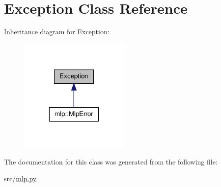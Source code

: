 \hypertarget{classException}{
\section{Exception Class Reference}
\label{classException}
}


Inheritance diagram for Exception:
\nopagebreak
\begin{figure}[H]
\begin{center}
\leavevmode
\includegraphics[width=154pt]{classException__inherit__graph}
\end{center}
\end{figure}


The documentation for this class was generated from the following file:\begin{DoxyCompactItemize}
\item 
src/\hyperlink{mlp_8py}{mlp.py}\end{DoxyCompactItemize}
